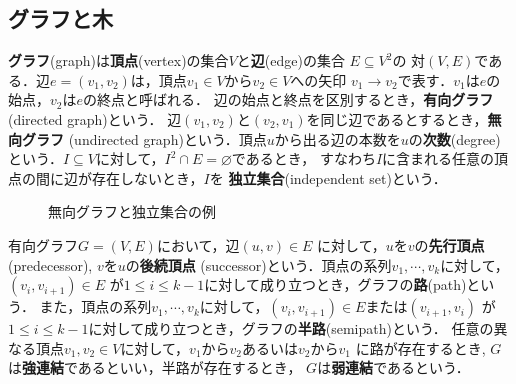\documentclass[a4j,dvipdfmx]{jbook}
\begin{document}
\subsection{グラフと木}

{\bf グラフ}(graph)は{\bf 頂点}(vertex)の集合$V$と{\bf 辺}(edge)の集合
$E\subseteq V^2$の
対$(V,E)$である．辺$e=(v_1,v_2)$は，頂点$v_1\in V$から$v_2\in V$への矢印
$v_1\rightarrow v_2$で表す．$v_1$は$e$の始点，$v_2$は$e$の終点と呼ばれる．
辺の始点と終点を区別するとき，{\bf 有向グラフ}(directed graph)という．
辺$(v_1,v_2)$と$(v_2,v_1)$を同じ辺であるとするとき，{\bf 無向グラフ}
(undirected graph)という．頂点$u$から出る辺の本数を$u$の{\bf 次数}(degree)
という．$I\subseteq V$に対して，$I^2\cap E=\varnothing$であるとき，
すなわち$I$に含まれる任意の頂点の間に辺が存在しないとき，$I$を
{\bf 独立集合}(independent set)という．

\begin{figure}[htbp]
  \centering
  \caption{無向グラフと独立集合の例}
  \label{fig:independent_set}
\end{figure}

有向グラフ$G=(V,E)$において，辺$(u,v)\in E$
に対して，$u$を$v$の{\bf 先行頂点}(predecessor), $v$を$u$の{\bf 後続頂点}
(successor)という．頂点の系列$v_1,\cdots,v_k$に対して，$(v_i,v_{i+1})\in E$
が$1\leq i\leq k-1$に対して成り立つとき，グラフの{\bf 路}(path)という．
また，頂点の系列$v_1,\cdots,v_k$に対して，$(v_i,v_{i+1})\in E$または$(v_{i+1},v_i)$
が$1\leq i\leq k-1$に対して成り立つとき，グラフの{\bf 半路}(semipath)という．
任意の異なる頂点$v_1,v_2\in V$に対して，$v_1$から$v_2$あるいは$v_2$から$v_1$
に路が存在するとき, $G$は{\bf 強連結}であるといい，半路が存在するとき，
$G$は{\bf 弱連結}であるという．
\end{document}
